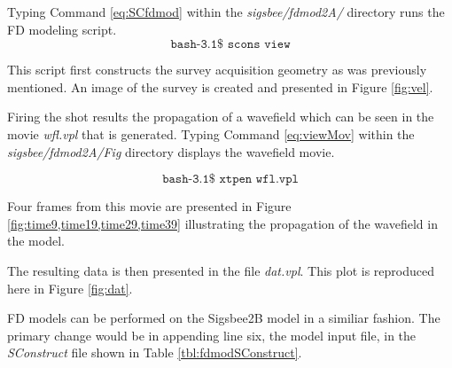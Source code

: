 {
\tiny

\normalsize
}

Typing Command \ref{eq:SCfdmod} within the \emph{sigsbee/fdmod2A/} directory runs the FD modeling script.
\begin{equation}\label{eq:SCfdmod} \texttt{bash-3.1\$\ scons\ view} \end{equation}

This script first constructs the survey acquisition geometry as was previously mentioned.  An image of the survey is created and presented
in Figure \ref{fig:vel}.


Firing the shot results the propagation of a wavefield which can be seen in the movie \emph{wfl.vpl} that is generated.  Typing
Command \ref{eq:viewMov} within the \emph{sigsbee/fdmod2A/Fig} directory displays the wavefield movie.

\begin{equation}\label{eq:viewMov} \texttt{bash-3.1\$\ xtpen\ wfl.vpl} \end{equation}


Four frames from this movie are presented in Figure \ref{fig:time9,time19,time29,time39}  illustrating the
propagation of the wavefield in the model.



The resulting data is then presented in the file \emph{dat.vpl}.  This plot is reproduced here in Figure \ref{fig:dat}.  



FD models can be performed on the Sigsbee2B model in a similiar fashion.  The primary change would be in appending line six, the 
model input file, in the \emph{SConstruct} file shown in Table \ref{tbl:fdmodSConstruct}.    


